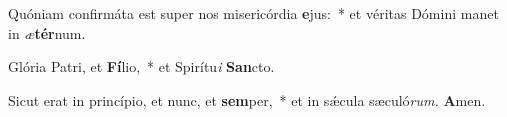 \item Quóniam confirmáta est super nos misericórdia \textbf{e}jus:~* et véritas Dómini manet in \textit{æ}\textbf{tér}num.
\item Glória Patri, et \textbf{Fí}lio,~* et Spirítu\textit{i} \textbf{San}cto.
\item Sicut erat in princípio, et nunc, et \textbf{sem}per,~* et in sǽcula sæculó\textit{rum.} \textbf{A}men.
